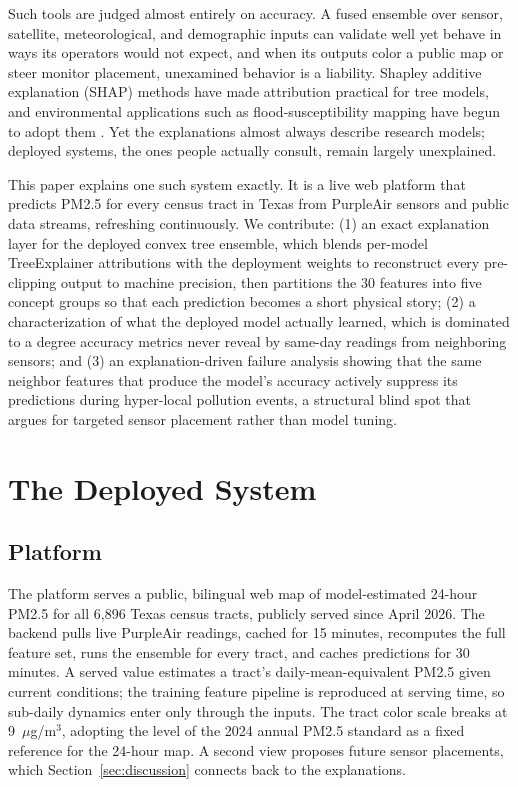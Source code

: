 \documentclass[conference]{IEEEtran}
\newcommand{\ugm}{$\mu$g/m$^3$}
\begin{document}
Such tools are judged almost entirely on accuracy. A fused ensemble over
sensor, satellite, meteorological, and demographic inputs can validate
well yet behave in ways its operators would not expect, and when its
outputs color a public map or steer monitor placement, unexamined behavior
is a liability. Shapley additive explanation
(SHAP) methods \cite{lundberg2017, lundberg2020} have made attribution
practical for tree models, and environmental applications such as
flood-susceptibility mapping have begun to adopt them \cite{choubin2025}.
Yet the
explanations almost always describe research models; deployed systems,
the ones people actually consult, remain largely unexplained.

This paper explains one such system exactly. It is a live web platform that
predicts PM2.5 for every census tract in Texas from PurpleAir sensors and
public data streams, refreshing continuously. We contribute:
(1) an exact explanation layer for the deployed convex tree ensemble, which
blends per-model TreeExplainer attributions with the deployment weights to
reconstruct every pre-clipping output to machine precision, then
partitions the 30 features into five concept groups so that each
prediction becomes a short physical story; (2) a characterization of what the deployed model actually
learned, which is dominated to a degree accuracy metrics never reveal by
same-day readings from neighboring sensors; and (3) an explanation-driven
failure analysis showing that the same neighbor features that produce the
model's accuracy actively suppress its predictions during hyper-local
pollution events, a structural blind spot that argues for targeted sensor
placement rather than model tuning.

\section{The Deployed System}
\label{sec:system}
\subsection{Platform}
The platform serves a public, bilingual web map of model-estimated 24-hour
PM2.5 for all 6,896 Texas census tracts, publicly served since April 2026.
The backend pulls live PurpleAir readings, cached for 15 minutes, recomputes the full feature set, runs the
ensemble for every tract, and caches predictions for 30 minutes. A served
value estimates a tract's daily-mean-equivalent PM2.5 given current
conditions; the training feature pipeline is reproduced at serving time, so
sub-daily dynamics enter only through the inputs. The tract color scale
breaks at 9~\ugm{}, adopting the level of the 2024 annual PM2.5 standard
\cite{epa2024naaqs} as a fixed reference for the 24-hour map. A second view
proposes future sensor placements, which Section~\ref{sec:discussion}
connects back to the explanations.
\end{document}
